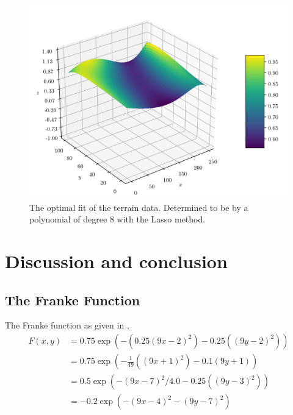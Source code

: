 \documentclass[11pt]{article}
\begin{document}
\begin{figure}[H]
    \centering
    \includegraphics[scale=0.8]{../fig/lasso_fit_deg8.png}
    \caption{The optimal fit of the terrain data. Determined to be by a polynomial of degree 8 with the Lasso method.}
    \label{fig:optimal_fit}
\end{figure}


\section{Discussion and conclusion}


\begin{appendices}
\subsection{The Franke Function} \label{sec:appendix}
The Franke function as given in \cite{franke1979critical},
\begin{align}
    F(x,y) &= 0.75\exp\left(-\left(0.25\left(9x-2\right)^2\right) - 0.25\left(\left(9y-2\right)^2\right)\right) \\
    &= 0.75\exp\left(-\frac{1}{49}\left(\left(9x+1\right)^2\right) - 0.1\left(9y+1\right)\right) \\
    &= 0.5\exp\left(-\left(9x-7\right)^2/4.0 - 0.25\left(\left(9y-3\right)^2\right)\right) \\
    &= -0.2\exp\left(-\left(9x-4\right)^2 - \left(9y-7\right)^2\right)
    \label{eq:franke_function}
\end{align}
\end{appendices}



\end{document}
